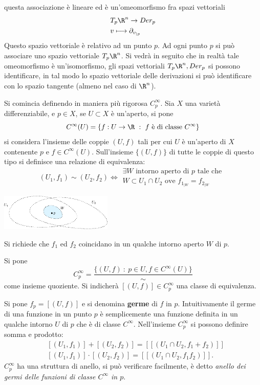 \documentclass[10pt, letterpaper]{report}
\begin{document}
questa associazione è lineare ed è un'omeomorfismo fra spazi vettoriali\begin{align}
    &T_p\R^n\rightarrow Der_p\\ 
    & v\longmapsto  \partial_{v_{|p}}
\end{align}
Questo spazio vettoriale è relativo ad un punto $p$. Ad ogni punto $p$ si può associare uno spazio vettoriale  $T_p\R^n$. Si vedrà in seguito che in realtà tale omeomorfismo è un'isomorfismo, gli spazi vettoriali $T_p\R^n, Der_p$ si possono identificare, in tal modo lo spazio vettoriale delle derivazioni si può identificare con lo spazio tangente (almeno nel caso di $\R^n$).\bigskip

\noindent
Si comincia definendo in maniera più rigorosa $C^\infty_p$. Sia $X$ una varietà differenziabile, e $p\in X$, se $U\subset X$ è un'aperto, si pone\begin{equation}
    C^\infty(U)=\{f:U\rightarrow\R \ : \ f\text{ è di classe }C^\infty\}
\end{equation}
si considera l'insieme delle coppie $(U,f)$ tali per cui $U$ è un'aperto di $X$ contenente $p$ e $f\in C^\infty(U)$. Sull'insieme $\{(U,f)\}$ di tutte le coppie di questo tipo si definisce una relazione di equivalenza:\begin{equation}
    (U_1,f_1)\sim (U_2,f_2)\iff \begin{matrix}
        \exists W\text{ intorno aperto di }p\text{ tale che }\\W\subset U_1\cap U_2\text{ ove }f_{1_{|W}}=f_{2_{|W}}
    \end{matrix}
\end{equation}\begin{center}
    \includegraphics[width=0.4\textwidth ]{images/relazione_C.eps}
\end{center}
Si richiede che $f_1$ ed $f_2$ coincidano in un qualche intorno aperto $W$ di $p$.
\begin{definizione}
    Si pone\begin{equation}
        C_p^\infty=\frac{\{(U,f) \ : \ p\in U, f\in C^\infty(U)\}}{\sim}
    \end{equation}
    come insieme quoziente. Si indicherà $[(U,f)]\in  C_p^\infty$ una classe di equivalenza.
\end{definizione}
Si pone $f_p=[(U,f)]$ e si denomina \textbf{germe} di $f$ in $p$. Intuitivamente il germe di una funzione in un punto $p$ è semplicemente una funzione definita in un qualche intorno $U$ di $p$ che è di classe $C^\infty$.
Nell'insieme $C_p^\infty$ si possono definire somma e prodotto:\begin{align}
    &[(U_1,f_1)]+[(U_2,f_2)]=[[(U_1\cap U_2,f_1+f_2)]]\\
    &[(U_1,f_1)]\cdot[(U_2,f_2)]=[[(U_1\cap U_2,f_1 f_2)]].
\end{align}
$C_p^\infty$ ha una struttura di anello, si può verificare facilmente, è detto \textit{anello dei germi delle funzioni di classe $C^\infty$ in $p$}.\bigskip
\end{document}
